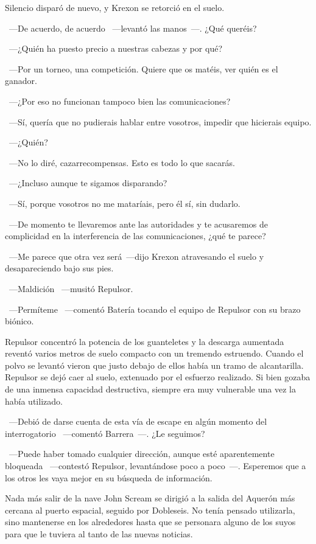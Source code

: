 Silencio disparó de nuevo, y Krexon se retorció en el suelo.

~---De acuerdo, de acuerdo ~---levantó las manos~---. ¿Qué queréis?

~---¿Quién ha puesto precio a nuestras cabezas y por qué?

~---Por un torneo, una competición. Quiere que os matéis, ver quién es el ganador.

~---¿Por eso no funcionan tampoco bien las comunicaciones?

~---Sí, quería que no pudierais hablar entre vosotros, impedir que hicierais equipo.

~---¿Quién?

~---No lo diré, cazarrecompensas. Esto es todo lo que sacarás.

~---¿Incluso aunque te sigamos disparando?

~---Sí, porque vosotros no me mataríais, pero él sí, sin dudarlo.

~---De momento te llevaremos ante las autoridades y te acusaremos de complicidad en la interferencia de las comunicaciones, ¿qué te parece?

~---Me parece que otra vez será~---dijo Krexon atravesando el suelo y desapareciendo bajo sus pies.

~---Maldición ~---musitó Repulsor.

~---Permíteme ~---comentó Batería tocando el equipo de Repulsor con su brazo biónico.

Repulsor concentró la potencia de los guanteletes y la descarga aumentada reventó varios metros de suelo compacto con un tremendo estruendo. Cuando el polvo se levantó vieron que justo debajo de ellos había un tramo de alcantarilla. Repulsor se dejó caer al suelo, extenuado por el esfuerzo realizado. Si bien gozaba de una inmensa capacidad destructiva, siempre era muy vulnerable una vez la había utilizado.

~---Debió de darse cuenta de esta vía de escape en algún momento del interrogatorio ~---comentó Barrera~---. ¿Le seguimos?

~---Puede haber tomado cualquier dirección, aunque esté aparentemente bloqueada ~---contestó Repulsor, levantándose poco a poco~---. Esperemos que a los otros les vaya mejor en su búsqueda de información.

\parbreak
Nada más salir de la nave John Scream se dirigió a la salida del Aquerón más cercana al puerto espacial, seguido por Dobleseis. No tenía pensado utilizarla, sino mantenerse en los alrededores hasta que se personara alguno de los suyos para que le tuviera al tanto de las nuevas noticias.

